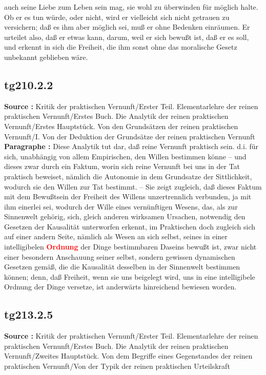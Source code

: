 \documentclass[a4paper,12pt,twoside]{book}
\newcommand{\match}[1]{\textcolor{red}{\textbf{#1}}}
\begin{document}
auch seine Liebe zum Leben sein mag, sie wohl zu überwinden für möglich halte. Ob er es tun würde, oder nicht, wird er vielleicht sich nicht getrauen zu versichern; daß es ihm aber möglich sei, muß er ohne Bedenken einräumen. Er urteilet also, daß er etwas kann, darum, weil er sich bewußt ist, daß er es soll, und erkennt in sich die Freiheit, die ihm sonst ohne das moralische Gesetz unbekannt geblieben wäre. 
	
	\subsection*{tg210.2.2} 
	\textbf{Source : }Kritik der praktischen Vernunft/Erster Teil. Elementarlehre der reinen praktischen Vernunft/Erstes Buch. Die Analytik der reinen praktischen Vernunft/Erstes Hauptstück. Von den Grundsätzen der reinen praktischen Vernunft/I. Von der Deduktion der Grundsätze der reinen praktischen Vernunft\\  
	
	\noindent\textbf{Paragraphe : }Diese Analytik tut dar, daß reine Vernunft praktisch sein. d.i. für sich, unabhängig von allem Empirischen, den Willen bestimmen könne – und dieses zwar durch ein Faktum, worin sich reine Vernunft bei uns in der Tat praktisch beweiset, nämlich die Autonomie in dem Grundsatze der Sittlichkeit, wodurch sie den Willen zur Tat bestimmt. – Sie zeigt zugleich, daß dieses Faktum mit dem Bewußtsein der Freiheit des Willens unzertrennlich verbunden, ja mit ihm einerlei sei, wodurch der Wille eines vernünftigen Wesens, das, als zur Sinnenwelt gehörig, sich, gleich anderen wirksamen Ursachen, notwendig den Gesetzen der Kausalität unterworfen erkennt, im Praktischen doch zugleich sich auf einer andern Seite, nämlich als Wesen an sich selbst, seines in einer intelligibelen \match{Ordnung} der Dinge bestimmbaren Daseins bewußt ist, zwar nicht einer besondern Anschauung seiner selbst, sondern gewissen dynamischen Gesetzen gemäß, die die Kausalität desselben in der Sinnenwelt bestimmen können; denn, daß Freiheit, wenn sie uns beigelegt wird, uns in eine intelligibele Ordnung der Dinge versetze, ist anderwärts hinreichend bewiesen worden. 
	
	\subsection*{tg213.2.5} 
	\textbf{Source : }Kritik der praktischen Vernunft/Erster Teil. Elementarlehre der reinen praktischen Vernunft/Erstes Buch. Die Analytik der reinen praktischen Vernunft/Zweites Hauptstück. Von dem Begriffe eines Gegenstandes der reinen praktischen Vernunft/Von der Typik der reinen praktischen Urteilskraft\\  
	
\end{document}
